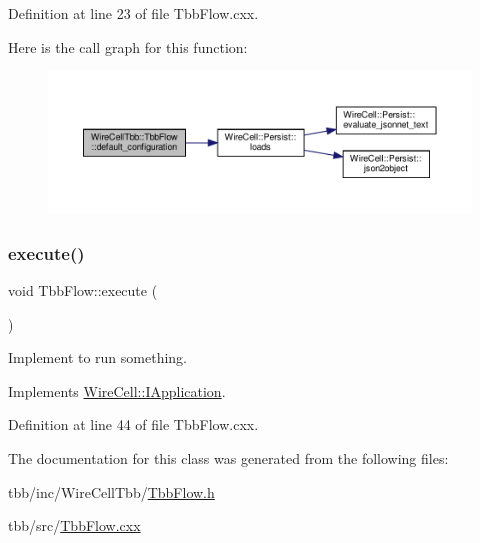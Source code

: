 Definition at line 23 of file Tbb\+Flow.\+cxx.

Here is the call graph for this function\+:
\nopagebreak
\begin{figure}[H]
\begin{center}
\leavevmode
\includegraphics[width=350pt]{class_wire_cell_tbb_1_1_tbb_flow_a8dacc14b5763a06f06e508aff481b9d2_cgraph}
\end{center}
\end{figure}
\mbox{\label{class_wire_cell_tbb_1_1_tbb_flow_a2a1da2a872decd5c243bf2fbd832bef6}} 
\subsubsection{\texorpdfstring{execute()}{execute()}}
{\footnotesize\ttfamily void Tbb\+Flow\+::execute (\begin{DoxyParamCaption}{ }\end{DoxyParamCaption})\hspace{0.3cm}{\ttfamily [virtual]}}



Implement to run something. 



Implements \hyperlink{class_wire_cell_1_1_i_application_a5c77275a37093541aaad6410d8ce5c31}{Wire\+Cell\+::\+I\+Application}.



Definition at line 44 of file Tbb\+Flow.\+cxx.



The documentation for this class was generated from the following files\+:\begin{DoxyCompactItemize}
\item 
tbb/inc/\+Wire\+Cell\+Tbb/\hyperlink{_tbb_flow_8h}{Tbb\+Flow.\+h}\item 
tbb/src/\hyperlink{_tbb_flow_8cxx}{Tbb\+Flow.\+cxx}\end{DoxyCompactItemize}
